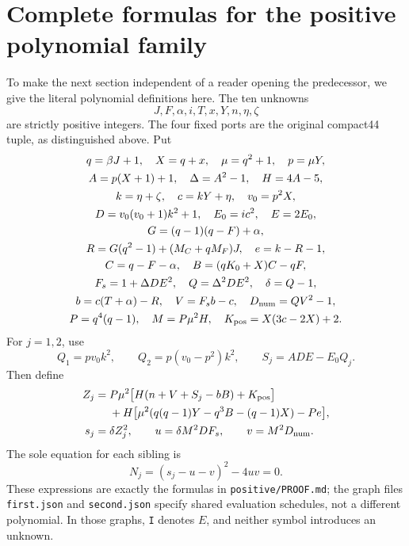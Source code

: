 \section{Complete formulas for the positive polynomial family}
To make the next section independent of a reader opening the predecessor,
we give the literal polynomial definitions here. The ten unknowns
\[
 J,F,\alpha,i,T,x,Y,n,\eta,\zeta
\]
are strictly positive integers. The four fixed ports are the original
compact44 tuple, as distinguished above. Put
\begin{gather*}
 q=\beta J+1,\quad X=q+x,\quad \mu=q^2+1,\quad p=\mu Y,\\
 A=p(X+1)+1,\quad \Delta=A^2-1,\quad H=4A-5,\\
 k=\eta+\zeta,\quad c=kY+\eta,\quad v_0=p^2X,\\
 D=v_0(v_0+1)k^2+1,\quad E_0=ic^2,\quad E=2E_0,\\
 G=(q-1)(q-F)+\alpha,\\
 R=G(q^2-1)+(M_C+qM_F)J,\quad e=k-R-1,\\
 C=q-F-\alpha,\quad B=(qK_0+X)C-qF,\\
 F_s=1+\Delta DE^2,\quad Q=\Delta^2DE^2,\quad \delta=Q-1,\\
 b=c(T+\alpha)-R,\quad V=F_sb-c,\quad D_{\rm num}=QV^2-1,\\
 P=q^4(q-1),\quad M=P\mu^2H,\quad K_{\rm pos}=X(3c-2X)+2.
\end{gather*}
For $j=1,2$, use
\[
 Q_1=pv_0k^2,\qquad Q_2=p(v_0-p^2)k^2,\qquad S_j=ADE-E_0Q_j.
\]
Then define
\begin{align*}
 Z_j={}&P\mu^2\bigl[H(n+V+S_j-bB)+K_{\rm pos}\bigr]\\
      &+H\bigl[\mu^2(q(q-1)Y-q^3B-(q-1)X)-Pe\bigr],\\
 s_j={}&\delta Z_j^2,\qquad u=\delta M^2DF_s,\qquad v=M^2D_{\rm num}.
\end{align*}
The sole equation for each sibling is
\[
 \boxed{N_j=(s_j-u-v)^2-4uv=0.}
\]
These expressions are exactly the formulas in \texttt{positive/PROOF.md};
the graph files \texttt{first.json} and \texttt{second.json} specify shared
evaluation schedules, not a different polynomial. In those graphs,
\texttt{I} denotes $E$, and neither symbol introduces an unknown.

